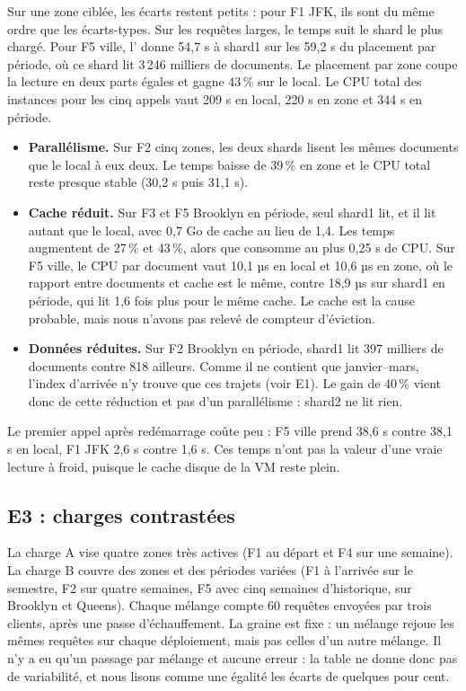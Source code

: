 Sur une zone ciblée, les écarts restent petits : pour F1 JFK, ils sont du même ordre que
les écarts-types. Sur les requêtes larges, le temps suit le shard le plus chargé. Pour F5
ville, l' donne 54,7 s à shard1 sur les 59,2 s du placement par période, où ce
shard lit 3\,246 milliers de documents. Le placement par zone coupe la lecture en deux
parts égales et gagne 43\,\% sur le local. Le CPU total des instances pour les cinq appels
vaut 209 s en local, 220 s en zone et 344 s en période.


\begin{itemize}
\item \textbf{Parallélisme.} Sur F2 cinq zones, les deux shards lisent les mêmes documents
que le local à eux deux. Le temps baisse de 39\,\% en zone et le CPU total reste presque
stable (30,2 s puis 31,1 s).
\item \textbf{Cache réduit.} Sur F3 et F5 Brooklyn en période, seul shard1 lit, et il lit
autant que le local, avec 0,7 Go de cache au lieu de 1,4. Les temps augmentent de 27\,\% et
43\,\%, alors que  consomme au plus 0,25 s de CPU. Sur F5 ville, le CPU par
document vaut 10,1 µs en local et 10,6 µs en zone, où le rapport entre documents et cache
est le même, contre 18,9 µs sur shard1 en période, qui lit 1,6 fois plus pour le même cache.
Le cache est la cause probable, mais nous n'avons pas relevé de compteur d'éviction.
\item \textbf{Données réduites.} Sur F2 Brooklyn en période, shard1 lit 397 milliers de
documents contre 818 ailleurs. Comme il ne contient que janvier--mars, l'index d'arrivée
n'y trouve que ces trajets (voir E1). Le gain de 40\,\% vient donc de cette réduction et
pas d'un parallélisme : shard2 ne lit rien.
\end{itemize}
Le premier appel après redémarrage coûte peu : F5 ville prend 38,6 s contre 38,1 s en local,
F1 JFK 2,6 s contre 1,6 s. Ces temps n'ont pas la valeur d'une vraie lecture à froid, puisque
le cache disque de la VM reste plein.

\subsection{E3 : charges contrastées}
La charge A vise quatre zones très actives (F1 au départ et F4 sur une semaine). La charge B
couvre des zones et des périodes variées (F1 à l'arrivée sur le semestre, F2 sur quatre
semaines, F5 avec cinq semaines d'historique, sur Brooklyn et Queens). Chaque mélange compte
60 requêtes envoyées par trois clients, après une passe d'échauffement. La graine est fixe :
un mélange rejoue les mêmes requêtes sur chaque déploiement, mais pas celles d'un autre
mélange. Il n'y a eu qu'un passage par mélange et aucune erreur : la table ne donne donc pas
de variabilité, et nous lisons comme une égalité les écarts de quelques pour cent.

